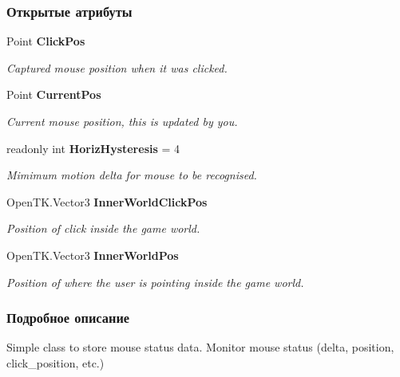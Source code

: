 \subsubsection*{Открытые атрибуты}
\begin{DoxyCompactItemize}
\item 
Point {\bf Click\+Pos}\label{class_win_form_animation2_d_1_1_mouse_state_aff1227a0577100876a98c04ad407d9f4}

\begin{DoxyCompactList}\small\item\em Captured mouse position when it was clicked. \end{DoxyCompactList}\item 
Point {\bf Current\+Pos}\label{class_win_form_animation2_d_1_1_mouse_state_aa03fd24e8bc7ea3e7ed22a9c564cb650}

\begin{DoxyCompactList}\small\item\em Current mouse position, this is updated by you. \end{DoxyCompactList}\item 
readonly int {\bf Horiz\+Hysteresis} = 4\label{class_win_form_animation2_d_1_1_mouse_state_a2564dfd90e7599c1f850ecc35b4243ea}

\begin{DoxyCompactList}\small\item\em Mimimum motion delta for mouse to be recognised. \end{DoxyCompactList}\item 
Open\+T\+K.\+Vector3 {\bf Inner\+World\+Click\+Pos}\label{class_win_form_animation2_d_1_1_mouse_state_a2ba32d9d742f09b887d7487ead69490c}

\begin{DoxyCompactList}\small\item\em Position of click inside the game world. \end{DoxyCompactList}\item 
Open\+T\+K.\+Vector3 {\bf Inner\+World\+Pos}\label{class_win_form_animation2_d_1_1_mouse_state_ae4a531cfd584f7535a84d3491c0d233a}

\begin{DoxyCompactList}\small\item\em Position of where the user is pointing inside the game world. \end{DoxyCompactList}\end{DoxyCompactItemize}


\subsubsection{Подробное описание}
Simple class to store mouse status data. Monitor mouse status (delta, position, click\+\_\+position, etc.) 

